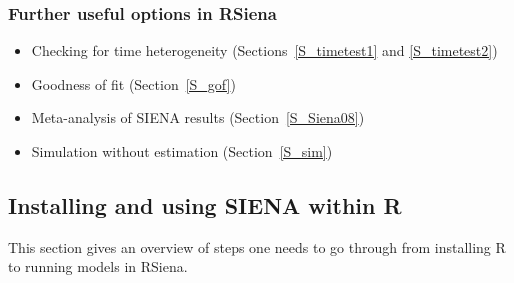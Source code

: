 \documentclass[a4paper,fleqn,11pt]{article}
\newcommand{\+}{\, + \,}
\newcommand{\R}{{\sf R }}
\newcommand{\Rn}{{\sf R}}
\newcommand{\rs}{{\sf RSiena}}
\newcommand{\RS}{{\sf RSiena }}
\newcommand{\SI}{{\sf SIENA }}
\begin{document}
\newpage
\subsubsection{Further useful options in \RS}
\label{S_etc}
\begin{itemize}
	\item	Checking for time heterogeneity (Sections~\ref{S_timetest1}
            and \ref{S_timetest2})
	\item	Goodness of fit (Section~\ref{S_gof})
	\item	Meta-analysis of \SI results (Section~\ref{S_Siena08})
	\item	Simulation without estimation (Section~\ref{S_sim})
\end{itemize}

\subsection{Installing and using \SI within \Rn}
\label{S_use}
\noindent
This section gives an overview of steps one needs to go through from
installing \R to running models in \rs.
\end{document}
